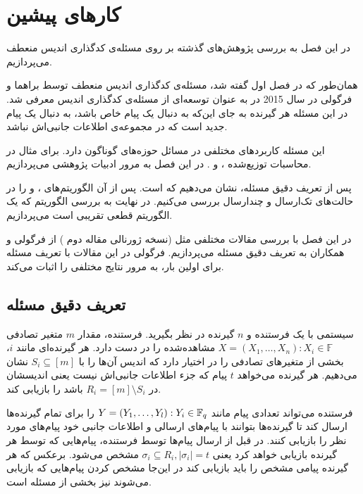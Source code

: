\chapter{کارهای پیشین}
\label{chapter:literature}

در این فصل به بررسی پژوهش‌های گذشته بر روی مسئله‌ی کدگذاری اندیس منعطف می‌پردازیم.

همان‌طور که در فصل اول گفته شد، مسئله‌ی کدگذاری اندیس منعطف توسط براهما و فرگولی در سال 2015 در
\cite{pliablefirstpaper}
به عنوان توسعه‌ای از مسئله‌ی کدگذاری اندیس معرفی شد. در این مسئله هر گیرنده به جای این‌که به دنبال یک پیام خاص باشد، به دنبال یک پیام جدید است که در مجموعه‌ی اطلاعات جانبی‌‌اش نباشد.

این مسئله کاربردهای مختلفی در مسائل حوزه‌های گوناگون دارد. برای مثال در محاسبات توزیع‌شده
\cite{datashuf}،
\cite{8404065}
و
\cite{8682270}.
در این فصل به مرور ادبیات پژوهشی 
\picod
می‌پردازیم.

پس از تعریف دقیق مسئله، نشان می‌دهیم که 
\picod
\nphard 
است. پس از آن الگوریتم‌های
،
و
را در حالت‌های تک‌ارسال و چندارسال بررسی می‌کنیم. در نهایت به بررسی الگوریتم
که یک الگوریتم قطعی تقریبی است می‌پردازیم.

در این فصل با بررسی مقالات مختلفی مثل
\cite{pliablefirstpaper,6620405, pliable2015paper,  song2017polynomialtime}
(نسخه ژورنالی مقاله دوم
\cite{pliable2016})
از فرگولی و همکاران به تعریف دقیق مسئله می‌پردازیم. فرگولی در این مقالات با تعریف مسئله برای اولین بار، به مرور نتایج مختلفی را اثبات می‌کند.
\section{تعریف دقیق مسئله}
\label{sec:3:3}
	سیستمی با یک فرستنده و 
	$n$
	گیرنده در نظر بگیرید. فرستنده، مقدار
	$m$
	متغیر تصادفی
	$X = (X_1, \ldots, X_n): X_i \in \mathbb{F}$
	مشاهده‌شده را در دست دارد. هر گیرنده‌ای مانند 
	$i$،
	بخشی از متغیرهای تصادفی را در اختیار دارد که اندیس آن‌ها را با 
	$S_i \subseteq [m]$
	نشان می‌دهیم. هر گیرنده می‌خواهد 
	$t$
	پیام که جزء اطلاعات جانبی‌اش نیست یعنی اندیسشان در
	$R_i = [m] \setminus S_i$
	باشد را بازیابی کند.
	
	فرستنده می‌تواند تعدادی پیام مانند
	$Y = (Y_1, \ldots, Y_l): Y_i \in {\mathbb{F}_q}$
	را برای تمام گیرنده‌ها ارسال کند تا گیرنده‌ها بتوانند با پیام‌های ارسالی و اطلاعات جانبی خود پیام‌های مورد نظر را بازیابی کنند. در
	\picod
	قبل از ارسال پیام‌ها توسط فرستنده، پیام‌هایی که توسط هر گیرنده بازیابی خواهد کرد یعنی
	$\sigma_i \subseteq R_i,  |\sigma_i| = t$
	 مشخص می‌شود. برعکس 
	\icod
	 که هر گیرنده پیامی مشخص را باید بازیابی کند در این‌جا مشخص کردن پیام‌هایی که بازیابی می‌شوند نیز بخشی از مسئله است.
	 
